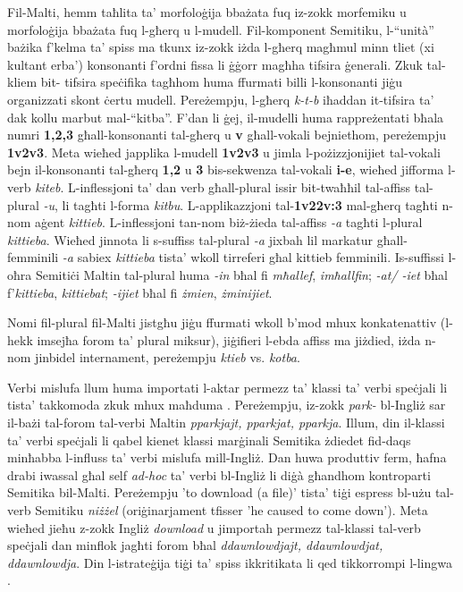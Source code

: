 \documentclass[]{../../metanetpaper}
\begin{document}
\begin{multicols}{2}
Fil-Malti, hemm taħlita ta’ morfoloġija bbażata fuq iz-zokk morfemiku u morfoloġija bbażata fuq l-għerq u l-mudell. Fil-komponent Semitiku, l-``unità'' bażika f’kelma ta’ spiss ma tkunx iz-zokk iżda l-għerq magħmul minn tliet (xi kultant erba’) konsonanti f’ordni fissa li ġġorr magħha tifsira ġenerali. Zkuk tal-kliem bit- tifsira speċifika tagħhom huma ffurmati billi l-konsonanti jiġu organizzati skont ċertu mudell. Pereżempju, l-għerq \emph{k-t-b} iħaddan it-tifsira ta’ dak kollu marbut mal-``kitba''. F'dan li ġej, il-mudelli huma rappreżentati bħala numri \textbf{1,2,3} għall-konsonanti tal-għerq u \textbf{v} għall-vokali bejniethom, pereżempju \textbf{1v2v3}. Meta wieħed japplika l-mudell \textbf{1v2v3} u jimla l-pożizzjonijiet tal-vokali bejn il-konsonanti tal-għerq \textbf{1,2} u \textbf{3} bis-sekwenza tal-vokali \textbf{i-e}, wieħed jifforma l-verb \emph{kiteb}. L-inflessjoni ta’ dan verb għall-plural issir bit-twaħħil tal-affiss tal-plural \emph{-u}, li tagħti l-forma \emph{kitbu}. L-applikazzjoni tal-\textbf{1v22v:3} mal-għerq tagħti n-nom aġent \emph{kittieb}. L-inflessjoni tan-nom biż-żieda tal-affiss \emph{-a} tagħti l-plural \emph{kittieba}. Wieħed jinnota li s-suffiss tal-plural \emph{-a} jixbah lil markatur għall-femminili \emph{-a} sabiex \emph{kittieba} tista’ wkoll tirreferi għal kittieb femminili. Is-suffissi l-oħra Semitiċi Maltin tal-plural huma \emph{-in} bħal fi \emph{mħallef}, \emph{imħallfin}; \emph{-at/ -iet} bħal f’\emph{kittieba}, \emph{kittiebat}; \emph{-ijiet} bħal fi \emph{żmien}, \emph{żminijiet}. 

Nomi fil-plural fil-Malti jistgħu jiġu ffurmati wkoll b’mod mhux konkatenattiv (l-hekk imsejħa forom ta’ plural miksur), jiġifieri l-ebda affiss ma jiżdied, iżda n-nom jinbidel internament, pereżempju \emph{ktieb} vs. \emph{kotba}.

Verbi mislufa llum huma importati l-aktar permezz ta’ klassi ta’ verbi speċjali li tista’ takkomoda zkuk mhux maħduma \cite{Mifsud:1995}. Pereżempju, iz-zokk \emph{park-} bl-Ingliż sar il-bażi tal-forom tal-verbi Maltin \emph{pparkjajt, pparkjat, pparkja}. Illum, din il-klassi ta’ verbi speċjali li qabel kienet klassi marġinali Semitika żdiedet fid-daqs minħabba l-influss ta’ verbi mislufa mill-Ingliż. Dan huwa produttiv ferm, ħafna drabi iwassal għal self \emph{ad-hoc} ta’ verbi bl-Ingliż li diġà għandhom kontroparti Semitika bil-Malti. Pereżempju 'to download (a file)' tista’ tiġi espress bl-użu tal-verb Semitiku \emph{niżżel} (oriġinarjament tfisser 'he caused to come down'). Meta wieħed jieħu z-zokk Ingliż \emph{download} u  jimportah permezz tal-klassi tal-verb speċjali dan minflok jagħti forom bħal \emph{ddawnlowdjajt, ddawnlowdjat, ddawnlowdja}. Din l-istrateġija tiġi ta’ spiss ikkritikata li qed tikkorrompi l-lingwa \cite{Fabri:2011a}.


\end{multicols}
\end{document}
